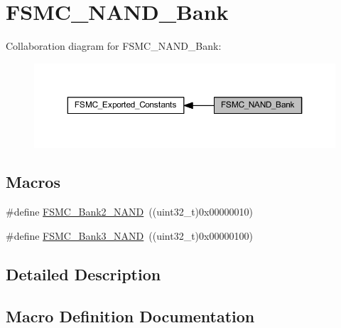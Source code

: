 \hypertarget{group___f_s_m_c___n_a_n_d___bank}{}\section{F\+S\+M\+C\+\_\+\+N\+A\+N\+D\+\_\+\+Bank}
\label{group___f_s_m_c___n_a_n_d___bank}
Collaboration diagram for F\+S\+M\+C\+\_\+\+N\+A\+N\+D\+\_\+\+Bank\+:
\nopagebreak
\begin{figure}[H]
\begin{center}
\leavevmode
\includegraphics[width=350pt]{group___f_s_m_c___n_a_n_d___bank}
\end{center}
\end{figure}
\subsection*{Macros}
\begin{DoxyCompactItemize}
\item 
\#define \hyperlink{group___f_s_m_c___n_a_n_d___bank_ga294e7134aa329a09e56b61eec9882a27}{F\+S\+M\+C\+\_\+\+Bank2\+\_\+\+N\+A\+ND}~((uint32\+\_\+t)0x00000010)
\item 
\#define \hyperlink{group___f_s_m_c___n_a_n_d___bank_gaf72def0732c026b0245d721ee371c85b}{F\+S\+M\+C\+\_\+\+Bank3\+\_\+\+N\+A\+ND}~((uint32\+\_\+t)0x00000100)
\end{DoxyCompactItemize}


\subsection{Detailed Description}


\subsection{Macro Definition Documentation}
\mbox{\label{group___f_s_m_c___n_a_n_d___bank_ga294e7134aa329a09e56b61eec9882a27}} 
